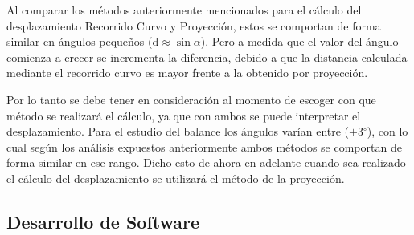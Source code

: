 \documentclass[12pt,a4paper]{article}
\newcommand{\grad}{$^{\circ}$}
\begin{document}
Al comparar los métodos anteriormente mencionados para el cálculo del desplazamiento Recorrido Curvo y Proyección, estos se comportan de forma similar en ángulos pequeños (d$\approx\sin\alpha$). Pero a medida que el valor del ángulo comienza a crecer se incrementa la diferencia, debido a que la distancia calculada mediante el recorrido curvo es mayor frente a la obtenido por proyección.

Por lo tanto se debe tener en consideración al momento de escoger con que método se realizará el cálculo, ya que con ambos se puede interpretar el desplazamiento. Para el estudio del balance los ángulos varían entre ($\pm 3$\grad), con lo cual según los análisis expuestos anteriormente ambos métodos se comportan de forma similar en ese rango.
Dicho esto de ahora en adelante cuando sea realizado el cálculo del desplazamiento se utilizará el método de la proyección.



\newpage
\subsection{Desarrollo de Software}
\end{document}
